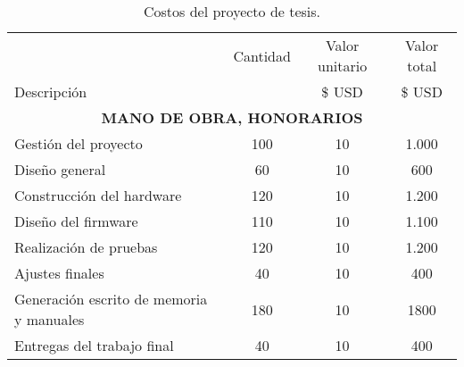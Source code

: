 \begin{table}[htpb]
\centering
\caption{Costos del proyecto de tesis.}
\label{tab:presupuesto}
\small
\begin{tabularx}{\linewidth}{@{}|X|c|r|r|@{}}
\hline
\rowcolor[HTML]{C0C0C0} 
\multicolumn{4}{|c|}{\cellcolor[HTML]{C0C0C0}COSTOS DIRECTOS} \\ \hline
\rowcolor[HTML]{C0C0C0} 
 &
  \multicolumn{1}{c|}{\cellcolor[HTML]{C0C0C0}Cantidad} &
  \multicolumn{1}{c|}{\cellcolor[HTML]{C0C0C0}Valor unitario} &
  \multicolumn{1}{c|}{\cellcolor[HTML]{C0C0C0}Valor total} \\ 
\rowcolor[HTML]{C0C0C0} Descripción  &
  \multicolumn{1}{c|}{\cellcolor[HTML]{C0C0C0}} &
  \multicolumn{1}{c|}{\cellcolor[HTML]{C0C0C0} \$ USD} &
  \multicolumn{1}{c|}{\cellcolor[HTML]{C0C0C0} \$ USD} \\ \hline
  
\multicolumn{4}{|c|}{\textbf{MANO DE OBRA, HONORARIOS }}\\ \hline
Gestión del proyecto		& \multicolumn{1}{c|}{	100	} & \multicolumn{1}{c|}{	10	} &  \multicolumn{1}{c|}{	1.000	} \\ \hline
Diseño general				& \multicolumn{1}{c|}{	60	} & \multicolumn{1}{c|}{	10	} &  \multicolumn{1}{c|}{	600	} \\ \hline
Construcción del hardware	& \multicolumn{1}{c|}{	120	} & \multicolumn{1}{c|}{	10	} &  \multicolumn{1}{c|}{	1.200	} \\ \hline
Diseño del firmware			& \multicolumn{1}{c|}{	110	} & \multicolumn{1}{c|}{	10	} &  \multicolumn{1}{c|}{	1.100	} \\ \hline
Realización de pruebas		& \multicolumn{1}{c|}{	120	} & \multicolumn{1}{c|}{	10	} &  \multicolumn{1}{c|}{	1.200	} \\ \hline
Ajustes finales				& \multicolumn{1}{c|}{	40	} & \multicolumn{1}{c|}{	10	} &  \multicolumn{1}{c|}{	400	} \\ \hline
Generación escrito de memoria y manuales	& \multicolumn{1}{c|}{	180	} & \multicolumn{1}{c|}{	10	} &  \multicolumn{1}{c|}{	1800	} \\ \hline
Entregas del trabajo final	& \multicolumn{1}{c|}{	40	} & \multicolumn{1}{c|}{	10	} &  \multicolumn{1}{c|}{	400	} \\ \hline


\end{tabularx}
\end{table}
